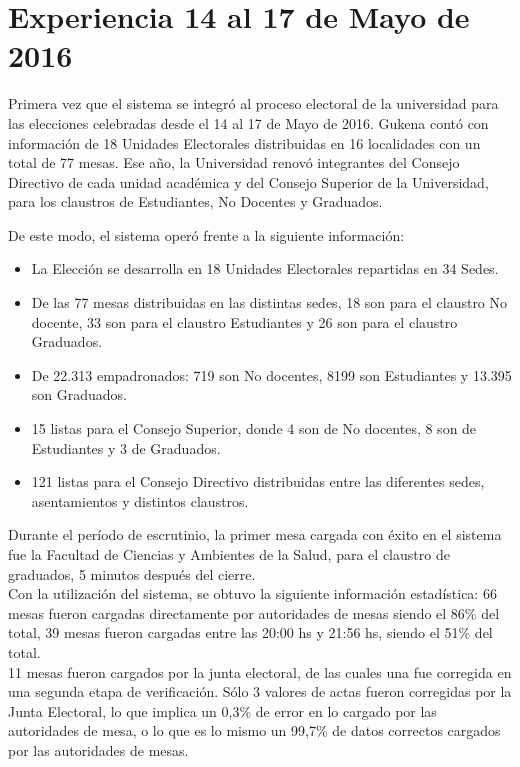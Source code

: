 \section{Experiencia 14 al 17 de Mayo de 2016}
\label{exp2016}
Primera vez que el sistema se integró al proceso electoral de la universidad para las elecciones celebradas desde el 14 al 17 de Mayo de 2016. Gukena contó con información de 18 Unidades Electorales distribuidas en 16 localidades con un total de 77 mesas. 
Ese año, la Universidad renovó integrantes del Consejo Directivo de cada unidad académica y del Consejo Superior de la Universidad, para los claustros de Estudiantes, No Docentes y Graduados. 

De este modo, el sistema operó frente a la siguiente información:
\begin{itemize}
    \item La Elección se desarrolla en 18 Unidades Electorales repartidas en 34 Sedes.
    \item De las 77 mesas distribuidas en las distintas sedes, 18 son para el claustro No docente, 33 son para el claustro Estudiantes y 26 son para el claustro Graduados.
    \item De 22.313 empadronados: 719 son No docentes, 8199 son Estudiantes y 13.395 son Graduados. 
    \item 15 listas para el Consejo Superior, donde 4 son de No docentes, 8 son de Estudiantes y 3 de Graduados.
    \item 121 listas para el Consejo Directivo distribuidas entre las diferentes sedes, asentamientos y distintos claustros.
\end{itemize}

Durante el período de escrutinio, la primer mesa cargada con éxito en el sistema fue la Facultad de Ciencias y Ambientes de la Salud, para el claustro de graduados, 5 minutos después del cierre.\\ 
Con la utilización del sistema, se obtuvo la siguiente información estadística:
66 mesas fueron cargadas directamente por autoridades de mesas siendo el 86\% del total, 39 mesas fueron cargadas entre las 20:00 hs y 21:56 hs, siendo el 51\% del total.\\
11 mesas fueron cargados por la junta electoral, de las cuales una fue corregida en una segunda etapa de verificación.
Sólo 3 valores de actas fueron corregidas por la Junta Electoral, lo que implica un 0,3\% de error en lo cargado por las autoridades de mesa, o lo que es lo mismo un 99,7\% de datos correctos cargados por las autoridades de mesas.

